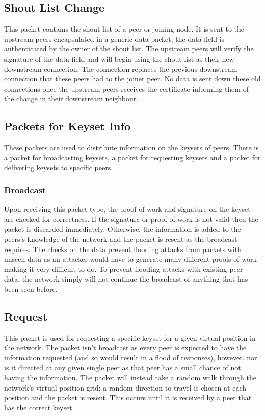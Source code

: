 \documentclass[ %
                    author={Luke Murray},
                supervisor={Dr. Simon Hollis},
                     title={Shadow Peer-to-Peer Networks},
                  subtitle={},
                    degree={MEng},
                      year={2013} ]{thesis}
\begin{document}
\subsection{Shout List Change}

This packet contains the shout list of a peer or joining node. It is sent to the upstream peers encapsulated in a generic data packet; the data field is authenticated by the owner of the shout list. The upstream peers will verify the signature of the data field and will begin using the shout list as their new downstream connection. The connection replaces the previous downstream connection that these peers had to the joiner peer. No data is sent down these old connections once the upstream peers receives the certificate informing them of the change in their downstream neighbour.

\subsection{Packets for Keyset Info}
\label{keysetinfo}

These packets are used to distribute information on the keysets of peers. There is a packet for broadcasting keysets, a packet for requesting keysets and a packet for delivering keysets to specific peers.

\subsubsection{Broadcast}

Upon receiving this packet type, the proof-of-work and signature on the keyset are checked for correctness. If the signature or proof-of-work is not valid then the packet is discarded immediately. Otherwise, the information is added to the peers's knowledge of the network and the packet is resent as the broadcast requires. The checks on the data prevent flooding attacks from packets with unseen data as an attacker would have to generate many different proofs-of-work making it very difficult to do. To prevent flooding attacks with existing peer data, the network simply will not continue the broadcast of anything that has been seen before.

\subsection{Request}

This packet is used for requesting a specific keyset for a given virtual position in the network. The packet isn't broadcast as every peer is expected to have the information requested (and so would result in a flood of responses), however, nor is it directed at any given single peer as that peer has a small chance of not having the information. The packet will instead take a random walk through the network's virtual position grid; a random direction to travel is chosen at each position and the packet is resent. This occurs until it is received by a peer that has the correct keyset.
\end{document}
